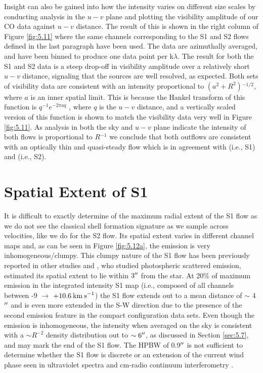 Insight can also be gained into how the intensity varies on different size scales by conducting analysis in the $u-v$ plane and plotting the visibility amplitude of our CO data against $u-v$ distance. The result of this is shown in the right column of Figure \ref{fig:5.11} where the same channels corresponding to the S1 and S2 flows defined in the last paragraph have been used. The data are azimuthally averaged, and have been binned to produce one data point per k$\lambda$. The result for both the S1 and S2 data is a steep drop-off in visibility amplitude over a relatively short $u-v$ distance, signaling that the sources are well resolved, as expected. Both sets of visibility data are consistent with an intensity proportional to $(a^2 + R^2){}^{-1/2}$, where $a$ is an inner spatial limit. This is because the Hankel transform of this function is $q^{-1}e^{-2\pi aq}$ \citep{bracewell_2000}, where $q$ is the $u-v$ distance, and a vertically scaled version of this function is shown to match the visibility data very well in Figure \ref{fig:5.11}. As analysis in both the sky and $u-v$ plane indicate the intensity of both flows is proportional to $R{}^{-1}$ we conclude that both outflows are  consistent with an optically thin and quasi-steady flow which is in agreement with \cite{smith_2009} (i.e., S1) and \cite{plez_2002} (i.e., S2). 

\section{Spatial Extent of S1}\label{sec:5.8}
It is difficult to exactly determine of the maximum radial extent of the S1 flow  as we do not see the classical shell formation signature as we sample across velocities, like we do for the S2 flow. Its spatial extent varies in different channel maps and, as can be seen in Figure \ref{fig:5.12a}, the emission is very inhomogeneous/clumpy. This clumpy nature of the S1 flow has been previously reported in other studies \citep{kervella_2011,smith_2009} and \cite{smith_2009}, who studied photospheric scattered emission, estimated its spatial extent to lie within $3^{\prime\prime}$ from the star. At 20\% of maximum emission in the integrated intensity S1 map (i.e., composed of all channels between -9 $\rightarrow$ $+10.6\>{\rm km\>s}^{-1}$) the S1 flow extends out to a mean distance of $\sim$ 4$^{\prime\prime}$ and is even more extended in the S-W direction due to the presence of the second emission feature in the compact configuration data sets. Even though the emission is inhomogeneous, the intensity when averaged on the sky is consistent with a $\sim R^{-2}$ density distribution out to $\sim 6^{\prime\prime}$, as discussed in Section \ref{sec:5.7}, and may mark the end of the S1 flow. The HPBW of 0.9$^{\prime\prime}$ is not sufficient to determine whether the S1 flow is discrete or an extension of the current wind phase seen in ultraviolet spectra \citep[e.g.,][]{carpenter_1997} and cm-radio continuum interferometry \citep{lim_1998}.

